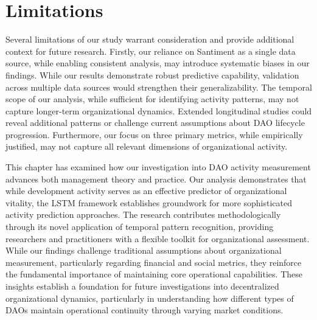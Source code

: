 \section{Limitations}

Several limitations of our study warrant consideration and provide additional context for future research. Firstly, our reliance on Santiment as a single data source, while enabling consistent analysis, may introduce systematic biases in our findings. While our results demonstrate robust predictive capability, validation across multiple data sources would strengthen their generalizability.
The temporal scope of our analysis, while sufficient for identifying activity patterns, may not capture longer-term organizational dynamics. Extended longitudinal studies could reveal additional patterns or challenge current assumptions about DAO lifecycle progression. Furthermore, our focus on three primary metrics, while empirically justified, may not capture all relevant dimensions of organizational activity.





This chapter has examined how our investigation into DAO activity measurement advances both management theory and practice. Our analysis demonstrates that while development activity serves as an effective predictor of organizational vitality, the LSTM framework establishes groundwork for more sophisticated activity prediction approaches. The research contributes methodologically through its novel application of temporal pattern recognition, providing researchers and practitioners with a flexible toolkit for organizational assessment. While our findings challenge traditional assumptions about organizational measurement, particularly regarding financial and social metrics, they reinforce the fundamental importance of maintaining core operational capabilities. These insights establish a foundation for future investigations into decentralized organizational dynamics, particularly in understanding how different types of DAOs maintain operational continuity through varying market conditions.






